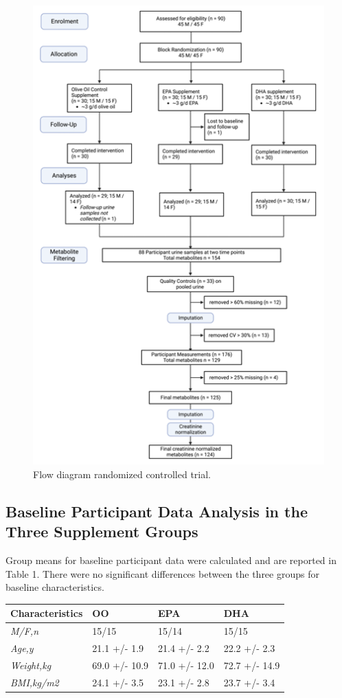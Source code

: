 \documentclass[journal=jacsat,manuscript=article]{achemso}
\begin{document}
\begin{figure}
\includegraphics[width=0.8\linewidth]{../Figures/Participants_study_design} \caption{\label{fig:fig1}Flow diagram randomized controlled trial.}\label{fig:unnamed-chunk-1}
\end{figure}

\subsection{Baseline Participant Data Analysis in the Three Supplement
Groups}\label{baseline-participant-data-analysis-in-the-three-supplement-groups}

Group means for baseline participant data were calculated and are
reported in Table 1. There were no significant differences between the
three groups for baseline characteristics.

\begin{longtable}[]{@{}llll@{}}
\toprule\noalign{}
\textbf{Characteristics} & \textbf{OO} & \textbf{EPA} & \textbf{DHA} \\
\midrule\noalign{}
\endhead
\bottomrule\noalign{}
\endlastfoot
\emph{M/F,n} & 15/15 & 15/14 & 15/15 \\
\emph{Age,y} & 21.1 +/- 1.9 & 21.4 +/- 2.2 & 22.2 +/- 2.3 \\
\emph{Weight,kg} & 69.0 +/- 10.9 & 71.0 +/- 12.0 & 72.7 +/- 14.9 \\
\emph{BMI,kg/m2} & 24.1 +/- 3.5 & 23.1 +/- 2.8 & 23.7 +/- 3.4 \\
\end{longtable}
\end{document}
